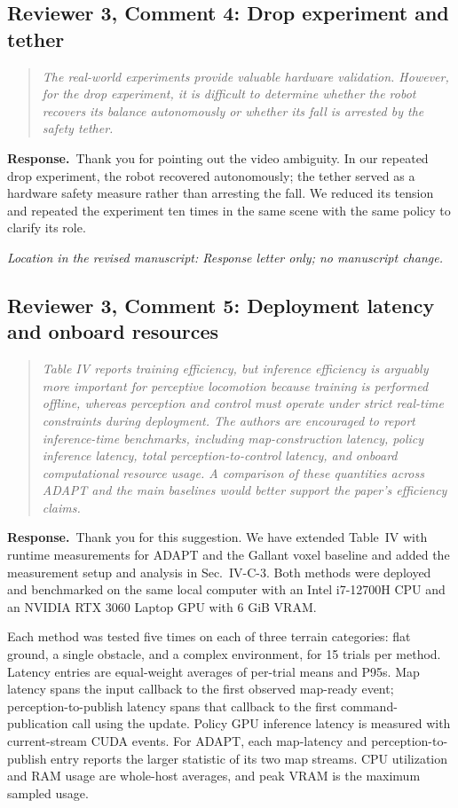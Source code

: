 \documentclass[11pt]{article}
\newenvironment{reviewcomment}{\begin{quote}\color{reviewblue}\itshape}{\end{quote}}
\newcommand{\Response}{\par\noindent\textbf{Response.}\ }
\newcommand{\Location}[1]{\par\noindent\textit{Location in the revised manuscript: #1}}
\begin{document}
\subsection*{Reviewer 3, Comment 4: Drop experiment and tether}
\begin{reviewcomment}
The real-world experiments provide valuable hardware validation. However, for the drop experiment, it is difficult to determine whether the robot recovers its balance autonomously or whether its fall is arrested by the safety tether.
\end{reviewcomment}
\Response Thank you for pointing out the video ambiguity. In our repeated drop experiment, the robot recovered autonomously; the tether served as a hardware safety measure rather than arresting the fall. We reduced its tension and repeated the experiment ten times in the same scene with the same policy to clarify its role.
\Location{Response letter only; no manuscript change.}



\subsection*{Reviewer 3, Comment 5: Deployment latency and onboard resources}
\begin{reviewcomment}
Table IV reports training efficiency, but inference efficiency is arguably more important for perceptive locomotion because training is performed offline, whereas perception and control must operate under strict real-time constraints during deployment. The authors are encouraged to report inference-time benchmarks, including map-construction latency, policy inference latency, total perception-to-control latency, and onboard computational resource usage. A comparison of these quantities across ADAPT and the main baselines would better support the paper's efficiency claims.
\end{reviewcomment}
\Response Thank you for this suggestion. We have extended Table~IV with runtime measurements for ADAPT and the Gallant voxel baseline and added the measurement setup and analysis in Sec.~IV-C-3. Both methods were deployed and benchmarked on the same local computer with an Intel i7-12700H CPU and an NVIDIA RTX 3060 Laptop GPU with 6 GiB VRAM.

Each method was tested five times on each of three terrain categories: flat ground, a single obstacle, and a complex environment, for 15 trials per method. Latency entries are equal-weight averages of per-trial means and P95s. Map latency spans the input callback to the first observed map-ready event; perception-to-publish latency spans that callback to the first command-publication call using the update. Policy GPU inference latency is measured with current-stream CUDA events. For ADAPT, each map-latency and perception-to-publish entry reports the larger statistic of its two map streams. CPU utilization and RAM usage are whole-host averages, and peak VRAM is the maximum sampled usage.
\end{document}
